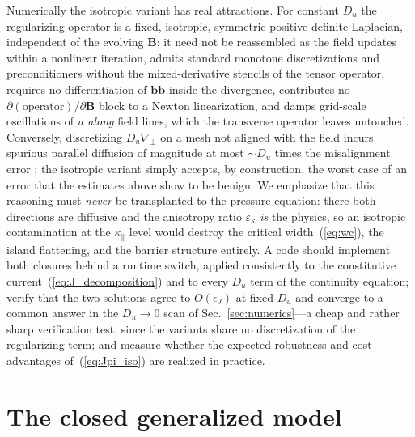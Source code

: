 \documentclass[english]{article}
\newcommand{\bB}{\mathbf{B}}
\newcommand{\bb}{\mathbf{b}}
\newcommand{\gradperp}{\nabla_{\!\perp}}
\begin{document}
Numerically the isotropic variant has real attractions. For constant $D_u$ the
regularizing operator is a fixed, isotropic, symmetric-positive-definite Laplacian,
independent of the evolving $\bB$: it need not be reassembled as the field updates
within a nonlinear iteration, admits standard monotone discretizations and
preconditioners without the mixed-derivative stencils of the tensor operator, requires
no differentiation of $\bb\bb$ inside the divergence, contributes no
$\partial(\mathrm{operator})/\partial\bB$ block to a Newton linearization, and damps
grid-scale oscillations of $u$ \emph{along} field lines, which the transverse operator
leaves untouched. Conversely, discretizing $D_u\gradperp$ on a mesh not aligned with the
field incurs spurious parallel diffusion of magnitude at most $\sim D_u$ times the
misalignment error \cite{gunter2005,sharma2007}; the isotropic variant simply accepts,
by construction, the worst case of an error that the estimates above show to be benign.
We emphasize that this reasoning must \emph{never} be transplanted to the pressure
equation: there both directions are diffusive and the anisotropy ratio
$\varepsilon_\kappa$ \emph{is} the physics, so an isotropic contamination at the
$\kappa_\parallel$ level would destroy the critical width~(\ref{eq:wc}), the island
flattening, and the barrier structure entirely. A code should implement both closures
behind a runtime switch, applied consistently to the constitutive
current~(\ref{eq:J_decomposition}) and to every $D_u$ term of the continuity equation;
verify that the two solutions agree to $O(\epsilon_J)$ at fixed $D_u$ and converge to a
common answer in the $D_u\rightarrow0$ scan of Sec.~\ref{sec:numerics}---a cheap and
rather sharp verification test, since the variants share no discretization of the
regularizing term; and measure whether the expected robustness and cost advantages
of~(\ref{eq:Jpi_iso}) are realized in practice.


\section{The closed generalized model}
\label{sec:model}
\end{document}
